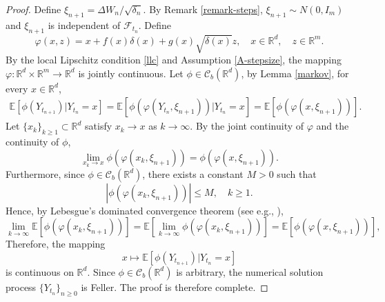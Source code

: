 \documentclass[preprint,12pt,compress]{elsarticle}
\begin{document}
\begin{proof}
Define $\xi_{n+1} = \Delta W_n /\sqrt{\delta_n}$. By Remark \ref{remark-steps}, ${\xi _{n + 1}} \sim N(0,{I_m})$ and $\xi_{n+1}$ is independent of $\mathcal{F}_{t_n}$. Define 
\begin{equation*}
	\varphi (x,z) = x + f(x)\delta (x) + g(x)\sqrt {\delta (x)} z, \quad x \in \mathbb{R}^d, \quad z \in \mathbb{R}^m.
\end{equation*}
By the local Lipschitz condition \eqref{llc} and Assumption \ref{A-stepsize}, the mapping $\varphi:\mathbb{R}^d \times \mathbb{R}^m \to \mathbb{R}^d$ is jointly continuous. Let
$\phi \in \mathcal{C}_b(\mathbb{R}^d)$, by Lemma \ref{markov}, for every $x \in \mathbb{R}^d$,
\begin{equation*}
	\begin{split}
		\mathbb{E}\left[ {\phi  ({Y_{{t_{n + 1}}}})|{Y_{{t_n}}} = x} \right] = \mathbb{E}\left[ {\phi  (\varphi ({Y_{{t_n}}},{\xi _{n + 1}}))|{Y_{{t_n}}} = x} \right] = \mathbb{E}\left[ {\phi  (\varphi (x,{\xi _{n + 1}}))} \right] .
	\end{split}
\end{equation*} 
Let ${\{ {x_k}\} _{k \ge 1}} \subset {\mathbb{R}^d} $ satisfy $x_k \to x$ as $k \to \infty$.
By the joint continuity of $\varphi$ and the continuity of $\phi$,
	\begin{equation*}
		\mathop {\lim }\limits_{x_k \to x} \phi  (\varphi (x_k,{\xi _{n + 1}})) = \phi  (\varphi (x,{\xi _{n + 1}})).
	\end{equation*}
Furthermore, since $\phi  \in {\mathcal{C}_b}({\mathbb{R}^d})$, there exists a constant $M > 0$ such that
\begin{equation*}
	\left| {\phi  (\varphi (x_k,{\xi _{n + 1}}))} \right| \le M, \quad k \ge 1.
\end{equation*}
Hence, by Lebesgue's dominated convergence theorem (see e.g., \cite[Theorem 3, p. 187]{shiryaev2019probability}),
\begin{equation*}
	\mathop {\lim }\limits_{k \to \infty} \mathbb{E}\left[ {\phi  (\varphi (x_k,{\xi _{n + 1}}))} \right] = \mathbb{E}\left[ {\mathop {\lim }\limits_{k \to \infty} \phi  (\varphi (x_k,{\xi _{n + 1}}))} \right] =  \mathbb{E}\left[ {\phi  (\varphi (x,{\xi _{n + 1}}))} \right],
\end{equation*}
Therefore, the mapping 
	\begin{equation*}
		x \mapsto \mathbb{E}\left[ {\phi ({Y_{{t_{n + 1}}}})|{Y_{{t_n}}} = x} \right]
	\end{equation*}
	is continuous on $\mathbb{R}^d$.
	Since $\phi\in\mathcal C_b(\mathbb R^d)$ is arbitrary, the numerical
	solution process $\{Y_{t_n}\}_{n\ge0}$ is Feller.
	The proof is therefore complete.
\end{proof}
\end{document}
